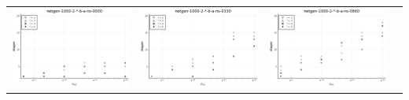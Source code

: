 \documentclass{article}
\begin{document}
\begin{landscape}
\begin{center}
\begin{longtable}{| c | c | c | c |}
                \hline
\includegraphics[height=0.22\textheight]{hiter_fixlim_netgen-1000-2-_-b-a-ns-0000.png} &
\includegraphics[height=0.22\textheight]{hiter_fixlim_netgen-1000-2-_-b-a-ns-0330.png} &
\includegraphics[height=0.22\textheight]{hiter_fixlim_netgen-1000-2-_-b-a-ns-0660.png} &

\end{longtable}
\end{center}
\end{landscape}
\end{document}
